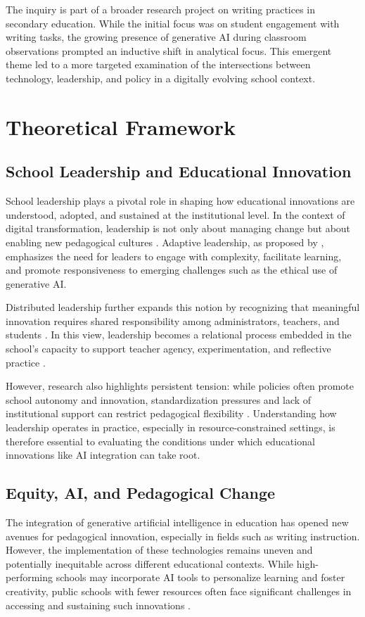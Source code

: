 \documentclass[english]{textolivre}
\begin{document}
The inquiry is part of a broader research project on writing practices in secondary education. While the initial focus was on student engagement with writing tasks, the growing presence of generative AI during classroom observations prompted an inductive shift in analytical focus. This emergent theme led to a more targeted examination of the intersections between technology, leadership, and policy in a digitally evolving school context.

\section{Theoretical Framework}\label{sec-normas}

\subsection{School Leadership and Educational Innovation}
School leadership plays a pivotal role in shaping how educational innovations are understood, adopted, and sustained at the institutional level. In the context of digital transformation, leadership is not only about managing change but about enabling new pedagogical cultures \cite{fullan2020leading}. Adaptive leadership, as proposed by \textcite{heifetz2009practice}, emphasizes the need for leaders to engage with complexity, facilitate learning, and promote responsiveness to emerging challenges such as the ethical use of generative AI.

Distributed leadership further expands this notion by recognizing that meaningful innovation requires shared responsibility among administrators, teachers, and students \cite{harris2014distributed,montecinos2018moving}. In this view, leadership becomes a relational process embedded in the school’s capacity to support teacher agency, experimentation, and reflective practice \cite{poekert2023leading}.

However, research also highlights persistent tension: while policies often promote school autonomy and innovation, standardization pressures and lack of institutional support can restrict pedagogical flexibility \cite{swaffield2020leadership,bass1990transactional}. Understanding how leadership operates in practice, especially in resource-constrained settings, is therefore essential to evaluating the conditions under which educational innovations like AI integration can take root.

\subsection{Equity, AI, and Pedagogical Change}\label{sec-conduta}
The integration of generative artificial intelligence in education has opened new avenues for pedagogical innovation, especially in fields such as writing instruction. However, the implementation of these technologies remains uneven and potentially inequitable across different educational contexts. While high-performing schools may incorporate AI tools to personalize learning and foster creativity, public schools with fewer resources often face significant challenges in accessing and sustaining such innovations \cite{unesco2021reimagining,atuahene2024overcoming}.
\end{document}
